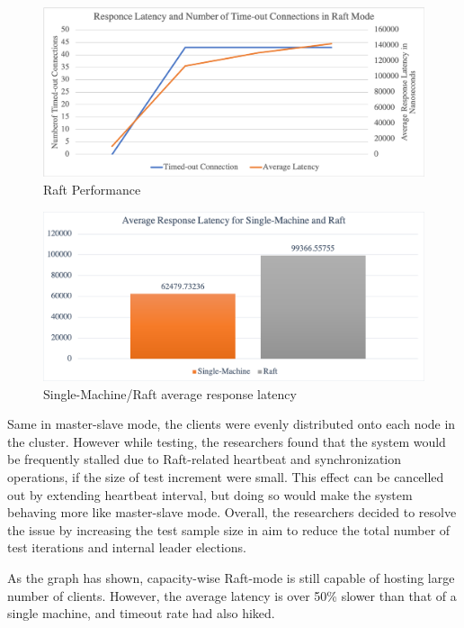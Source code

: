 \begin{figure}[H]
	\centering
	\includegraphics[scale=0.33]{figure/raft/performance.png}
	\caption{Raft Performance}
\end{figure}
	
\begin{figure}[H]
	\centering
	\includegraphics[scale=0.33]{figure/raft/response-latency.png}
	\caption{Single-Machine/Raft average response latency}
\end{figure}

Same in master-slave mode, the clients were evenly distributed onto each node in the cluster. However while testing, the researchers found that the system would be frequently stalled due to Raft-related heartbeat and synchronization operations, if the size of test increment were small. This effect can be cancelled out by extending heartbeat interval, but doing so would make the system behaving more like master-slave mode. Overall, the researchers decided to resolve the issue by increasing the test sample size in aim to reduce the total number of test iterations and internal leader elections. 

As the graph has shown, capacity-wise Raft-mode is still capable of hosting large number of clients. However, the average latency is over 50\% slower than that of a single machine, and timeout rate had also hiked.

